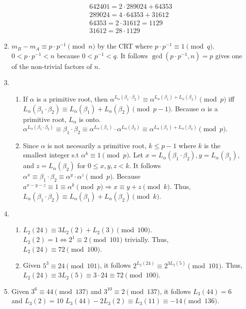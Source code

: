\documentclass[10pt]{article}
\begin{document}
\begin{enumerate}[label= \arabic*.]
\begin{align*}
        &642401=2\cdot 289024+64353\\
        &289024=4\cdot 64353+31612\\
        &64353=2\cdot31612=1129\\
        &31612=28\cdot 1129
    \end{align*}
    \item $m_B-m_A\equiv p\cdot p^{-1}\pmod{n}$ by the CRT where $p\cdot p^{-1}\equiv 1\pmod{q}$. 
    $0<p\cdot p^{-1}<n$ because $0<p^{-1}<q$. 
    It follows $\gcd(p\cdot p^{-1},n)=p$ gives one of the non-trivial factors of $n$.
    \item \begin{enumerate}
        \item If $\alpha$ is a primitive root, then $\alpha^{L_\alpha(\beta_1\cdot\beta_2)}\equiv\alpha^{L_\alpha(\beta_1)+L_\alpha(\beta_2)}\pmod{p}$ iff $L_\alpha(\beta_1\cdot\beta_2)\equiv L_\alpha(\beta_1)+L_\alpha(\beta_2)\pmod{p-1}$.
        Because $\alpha$ is a primitive root, $L_\alpha$ is onto.
        $\alpha^{L_\alpha(\beta_1\cdot\beta_2)}\equiv\beta_1\cdot \beta_2\equiv \alpha^{L_\alpha(\beta_1)}\cdot\alpha^{L_\alpha(\beta_2)}\equiv \alpha^{L_\alpha(\beta_1)+L_\alpha(\beta_2)}\pmod{p}$.
        \item Since $\alpha$ is not necesarily a primitive root, $k\le p-1$ where $k$ is the smallest integer s.t $\alpha^k\equiv 1\pmod{p}$.
        Let $x=L_\alpha(\beta_1\cdot\beta_2),y=L_\alpha(\beta_1)$, and $z=L_\alpha(\beta_2)$ for $0\le x,y,z<k$. 
        It follows $\alpha^x\equiv \beta_1\cdot\beta_2\equiv \alpha^y\cdot\alpha^z\pmod{p}$.
        Because $a^{x-y-z}\equiv1\equiv \alpha^k\pmod{p}\Rightarrow x\equiv y+z\pmod{k}$. 
        Thus, $L_\alpha(\beta_1\cdot\beta_2)\equiv L_\alpha(\beta_1)+L_\alpha(\beta_2)\pmod{k}$.
    \end{enumerate}
    \item \begin{enumerate}
        \item $L_2(24)\equiv 3L_2(2)+L_2(3)\pmod{100}$. 
        $L_2(2)=1\Leftrightarrow 2^1\equiv 2\pmod{101}$ trivially. 
        Thus, $L_2(24)\equiv 72\pmod{100}$.
        \item Given $5^3\equiv 24\pmod{101}$, 
        it follows $2^{L_2(24)}\equiv 2^{3L_2(5)}\pmod{101}$. 
        Thus, $L_2(24)\equiv 3L_2(5)\equiv 3\cdot 24\equiv 72\pmod{100}$.
    \end{enumerate}
    \item Given $3^6\equiv 44\pmod{137}$ and $3^{10}\equiv 2\pmod{137}$, it follows $L_3(44)=6$ and $L_3(2)=10$ $L_3(44)-2L_3(2)\equiv L_3(11)\equiv -14\pmod{136}$. 

\end{enumerate}
\end{document}
